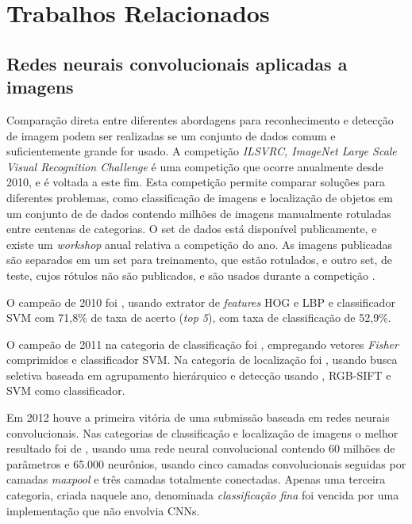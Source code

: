 
\chapter{Trabalhos Relacionados}

\section{Redes neurais convolucionais aplicadas a imagens}

Comparação direta entre diferentes abordagens para reconhecimento e detecção de
imagem podem ser realizadas se um conjunto de dados comum e suficientemente
grande for usado. A competição \emph{ILSVRC, ImageNet Large Scale Visual
Recognition Challenge} é uma competição que ocorre anualmente desde 2010, e é
voltada a este fim. Esta competição permite comparar soluções 
para diferentes problemas, como classificação de imagens e localização de
objetos em um conjunto de
de dados contendo milhões de imagens manualmente rotuladas entre centenas de
categorias. O set de dados está disponível publicamente, e existe um
\emph{workshop} anual relativa a competição do ano. As imagens publicadas são
separados em um set para treinamento, que estão rotulados, e outro set, de
teste, cujos rótulos não são publicados, e são usados durante a competição
 \cite{ILSVRC15}.

O campeão de 2010 foi , usando extrator de
\emph{features} HOG e LBP e classificador SVM com 71,8\% de taxa de
acerto (\emph{top 5}), com taxa de classificação de 52,9\%.

O campeão de 2011 na categoria de classificação foi
, empregando vetores
\emph{Fisher} comprimidos e classificador SVM. Na categoria de localização foi
, usando busca seletiva baseada em agrupamento
hierárquico e detecção usando , RGB-SIFT e SVM como classificador.

Em 2012 houve a primeira vitória de uma submissão baseada em redes neurais
convolucionais. Nas categorias de classificação e localização de imagens o
melhor resultado foi de , usando uma
rede neural convolucional contendo 60 milhões de parâmetros e 65.000
neurônios, usando cinco camadas
convolucionais seguidas por camadas \emph{maxpool} e três camadas totalmente
conectadas. Apenas uma terceira categoria, criada naquele ano, denominada
\emph{classificação fina} foi vencida por uma implementação que não envolvia
CNNs.

